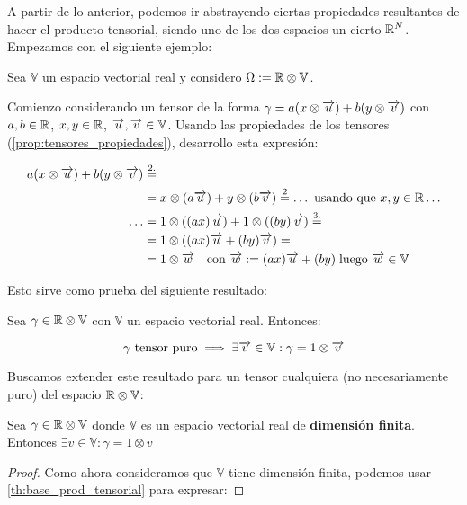 A partir de lo anterior, podemos ir abstrayendo ciertas propiedades resultantes de hacer el producto tensorial, siendo uno de los dos espacios un cierto $\mathbb{R}^N$. Empezamos con el siguiente ejemplo:

\begin{ejemplo}
    Sea $\mathbb{V}$ un espacio vectorial real y considero $\Omega := \mathbb{R} \otimes \mathbb{V}$.

    Comienzo considerando un tensor de la forma $\gamma = a(x \otimes \overrightarrow{u}) + b(y \otimes \overrightarrow{v})$ con $a, b \in \mathbb{R}$, $x, y \in \mathbb{R}$, $\overrightarrow{u}, \overrightarrow{v} \in \mathbb{V}$. Usando las propiedades de los tensores (\ref{prop:tensores_propiedades}), desarrollo esta expresión:

    \begin{equation}
    \begin{split}
        a(x \otimes \overrightarrow{u}) + b(y \otimes \overrightarrow{v}) &\stackrel{\text{2.}}{=} \\
        &= x \otimes (a\overrightarrow{u}) + y \otimes (b\overrightarrow{v}) \stackrel{\text{2}}{=} \ldots \text{ usando que }  x,y \in \mathbb{R} \ldots \\
        \ldots &= 1 \otimes ((ax) \overrightarrow{u}) + 1 \otimes ((by) \overrightarrow{v}) \stackrel{\text{3.}}{=} \\
        &= 1 \otimes ((ax)\overrightarrow{u} + (by) \overrightarrow{v}) = \\
        &= 1 \otimes \overrightarrow{w} \quad \text{con } \overrightarrow{w} := (ax)\overrightarrow{u} + (by) \; \text{luego } \overrightarrow{w} \in \mathbb{V}
    \end{split}
    \end{equation}

    Esto sirve como prueba del siguiente resultado:

    \begin{proposicion}
        Sea $\gamma \in \mathbb{R} \otimes \mathbb{V}$ con $\mathbb{V}$ un espacio vectorial real. Entonces:

        \begin{equation}
            \gamma \text{ tensor puro} \implies \exists \overrightarrow{v} \in \mathbb{V}: \gamma = 1 \otimes \overrightarrow{v}
        \end{equation}
    \end{proposicion}

    Buscamos extender este resultado para un tensor cualquiera (no necesariamente puro) del espacio $\mathbb{R} \otimes \mathbb{V}$:

    \begin{proposicion} \label{prop:r_otimes_v_es_v}
        Sea $\gamma \in \mathbb{R} \otimes \mathbb{V}$ donde $\mathbb{V}$ es un espacio vectorial real de \textbf{dimensión finita}. Entonces $\exists v \in \mathbb{V}: \gamma = 1 \otimes v$
    \end{proposicion}
    \begin{proof}
        Como ahora consideramos que $\mathbb{V}$ tiene dimensión finita, podemos usar \ref{th:base_prod_tensorial} para expresar:


\end{proof}
\end{ejemplo}
